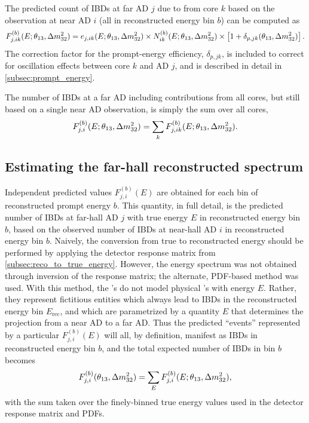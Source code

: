 The predicted count of IBDs at far AD $j$ due to \nuebar{} from core $k$
based on the observation at near AD $i$ (all in reconstructed energy bin $b$) can be computed as
\begin{equation}\label{eq:far_true_core_pred}
    F_{j,ik}^{(b)}(E;\theta_{13},\Delta m^2_{32}) = e_{j,ik}(E;\theta_{13},\Delta m^2_{32}) \times
        N_{ik}^{(b)}(E;\theta_{13},\Delta m^2_{32}) \times
        \left[1 + \delta_{p,jk}(\theta_{13}, \Delta m^2_{32})\right].
\end{equation}
The correction factor for the prompt-energy efficiency, $\delta_{p,jk}$, is included
to correct for oscillation effects between core $k$ and AD $j$,
and is described in detail in \cref{subsec:prompt_energy}.

The number of IBDs at a far AD including contributions from all cores,
but still based on a single near AD observation,
is simply the sum over all cores,
\begin{equation}
    F_{j,i}^{(b)}(E;\theta_{13},\Delta m^2_{32}) = \sum_k F_{j,ik}^{(b)}(E;\theta_{13},\Delta m^2_{32}).
\end{equation}

\subsection{Estimating the far-hall reconstructed spectrum}
\label{subsec:true_to_reco_farhall}

Independent predicted values $F_{j,i}^{(b)}(E)$ are obtained
for each bin of reconstructed prompt energy $b$.
This quantity, in full detail,
is the predicted number of IBDs at far-hall AD $j$
with true \nuebar{} energy $E$ in reconstructed energy bin $b$,
based on the observed number of IBDs at near-hall AD $i$
in reconstructed energy bin $b$.
Naively, the conversion from true to reconstructed energy
should be performed by applying the detector response matrix
from \cref{subsec:reco_to_true_energy}.
However, the \nuebar{} energy spectrum was not obtained
through inversion of the response matrix;
the alternate, PDF-based method was used.
With this method, the \nuebar{}'s do not model physical \nuebar{}'s with energy $E$.
Rather, they represent fictitious entities which always
lead to IBDs in the reconstructed energy bin $E_\text{rec}$,
and which are parametrized by a quantity $E$ that determines
the projection from a near AD to a far AD.
Thus the predicted ``events'' represented by a particular
$F_{j,i}^{(b)}(E)$ will all, by definition,
manifest as IBDs in reconstructed energy bin $b$,
and the total expected number of IBDs in bin $b$ becomes
\begin{equation}
    F_{j,i}^{(b)}(\theta_{13},\Delta m^2_{32}) = \sum_E F_{j,i}^{(b)}(E;\theta_{13},\Delta m^2_{32}),
\end{equation}
with the sum taken over the finely-binned true energy values
used in the detector response matrix and PDFs.

